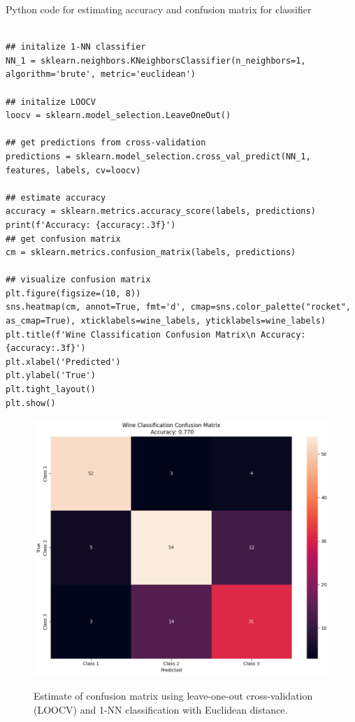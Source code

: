 \documentclass{article}
\begin{document}
\parbox{\textwidth}{Python code for estimating accuracy and confusion matrix for classifier}
\begin{center}
\begin{lstlisting}

## initalize 1-NN classifier
NN_1 = sklearn.neighbors.KNeighborsClassifier(n_neighbors=1, algorithm='brute', metric='euclidean')
  
## initalize LOOCV
loocv = sklearn.model_selection.LeaveOneOut()
  
## get predictions from cross-validation
predictions = sklearn.model_selection.cross_val_predict(NN_1, features, labels, cv=loocv)
  
## estimate accuracy
accuracy = sklearn.metrics.accuracy_score(labels, predictions)
print(f'Accuracy: {accuracy:.3f}')
## get confusion matrix
cm = sklearn.metrics.confusion_matrix(labels, predictions)
  
## visualize confusion matrix
plt.figure(figsize=(10, 8))
sns.heatmap(cm, annot=True, fmt='d', cmap=sns.color_palette("rocket", as_cmap=True), xticklabels=wine_labels, yticklabels=wine_labels)
plt.title(f'Wine Classification Confusion Matrix\n Accuracy: {accuracy:.3f}')
plt.xlabel('Predicted')
plt.ylabel('True')
plt.tight_layout()
plt.show()

\end{lstlisting}
\end{center}
  
\begin{figure}[H]
\includegraphics[width=1\textwidth]{q10_a.png} \\
\caption{Estimate of confusion matrix using leave-one-out cross-validation (LOOCV) and 1-NN classification with Euclidean distance.}
\label{fig:image_comparison}
\end{figure} 
\end{document}

